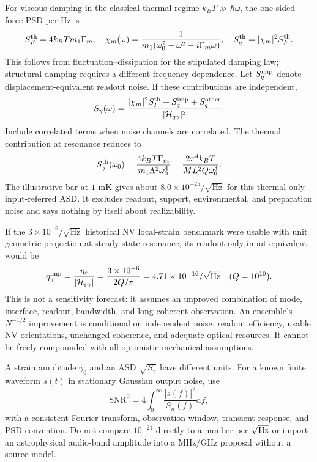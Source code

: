 \documentclass[a4paper,11pt]{article}
\newcommand{\dd}{\mathrm{d}}
\newcommand{\eps}{\varepsilon}
\begin{document}
For viscous damping in the classical thermal regime $k_BT\gg\hbar\omega$, the one-sided force PSD per Hz is
\begin{equation}
 S_F^{\rm th}=4k_BT m_1\Gamma_m,\quad
 \chi_m(\omega)=\frac1{m_1(\omega_0^2-\omega^2-i\Gamma_m\omega)},\quad
 S_q^{\rm th}=|\chi_m|^2S_F^{\rm th}.
\end{equation}
This follows from fluctuation--dissipation for the stipulated damping law; structural damping requires a different frequency dependence. Let $S_q^{\rm imp}$ denote displacement-equivalent readout noise. If these contributions are independent,
\begin{equation}
 S_\gamma(\omega)=\frac{|\chi_m|^2S_F^{\rm th}+S_q^{\rm imp}+S_q^{\rm other}}
 {|\mathcal H_{q\gamma}|^2}.
 \label{eq:noise}
\end{equation}
Include correlated terms when noise channels are correlated. The thermal contribution at resonance reduces to
\begin{equation}
 S_\gamma^{\rm th}(\omega_0)=\frac{4k_BT\Gamma_m}{m_1\Lambda^2\omega_0^4}
 =\frac{2\pi^4 k_BT}{ML^2Q\omega_0^3}.
\end{equation}
The illustrative bar at $1$ mK gives about $8.0\times10^{-25}/\sqrt{\mathrm{Hz}}$ for this thermal-only input-referred ASD. It excludes readout, support, environmental, and preparation noise and says nothing by itself about realizability.

If the $3\times10^{-6}/\sqrt{\mathrm{Hz}}$ historical NV local-strain benchmark were usable with unit geometric projection at steady-state resonance, its readout-only input equivalent would be
\begin{equation}
 \eta_\gamma^{\rm imp}=\frac{\eta_\eps}{|\mathcal H_{\eps\gamma}|}
 =\frac{3\times10^{-6}}{2Q/\pi}
 =4.71\times10^{-16}/\sqrt{\mathrm{Hz}}\quad(Q=10^{10}).
\end{equation}
This is not a sensitivity forecast: it assumes an unproved combination of mode, interface, readout, bandwidth, and long coherent observation. An ensemble's $N^{-1/2}$ improvement is conditional on independent noise, readout efficiency, usable NV orientations, unchanged coherence, and adequate optical resources. It cannot be freely compounded with all optimistic mechanical assumptions.

A strain amplitude $\gamma_0$ and an ASD $\sqrt{S_\gamma}$ have different units. For a known finite waveform $s(t)$ in stationary Gaussian output noise, use
\begin{equation}
 \mathrm{SNR}^2=4\int_0^\infty\frac{|\tilde s(f)|^2}{S_n(f)}\dd f,
 \label{eq:snr}
\end{equation}
with a consistent Fourier transform, observation window, transient response, and PSD convention. Do not compare $10^{-21}$ directly to a number per $\sqrt{\rm Hz}$ or import an astrophysical audio-band amplitude into a MHz/GHz proposal without a source model.
\end{document}

